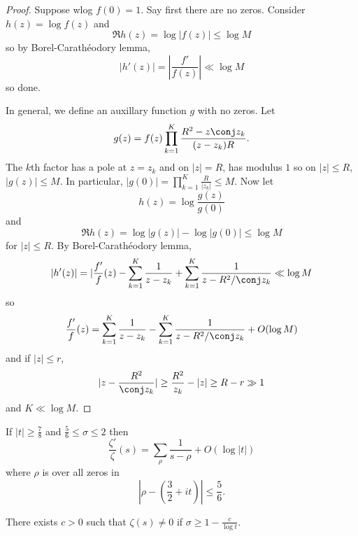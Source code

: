 \documentclass[a4paper]{article}
\theoremstyle{definition}
\begin{document}
\begin{proof}
  Suppose wlog \(f(0) = 1\). Say first there are no zeros. Consider \(h(z) = \log f(z)\) and
  \[
    \Re h(z) = \log |f(z)| \leq \log M
  \]
  so by Borel-Carathéodory lemma,
  \[
    |h'(z)| = |\frac{f'}{f(z)}| \ll \log M
  \]
  so done.

  In general, we define an auxillary function \(g\) with no zeros. Let
  \[
    g(z) = f(z) \prod_{k = 1}^K \frac{R^2 - z \conj z_k}{(z - z_k) R}.
  \]
  The \(k\)th factor has a pole at \(z = z_k\) and on \(|z| = R\), has modulus \(1\) so on \(|z| \leq R\), \(|g(z)| \leq M\). In particular, \(|g(0)| = \prod_{k = 1}^K \frac{R}{|z_k|} \leq M\). Now let
  \[
    h(z) = \log \frac{g(z)}{g(0)}
  \]
  and
  \[
    \Re h(z) = \log |g(z)| - \log |g(0)| \leq \log M
  \]
  for \(|z| \leq R\). By Borel-Carathéodory lemma,
  \[
    |h'(z)| = |\frac{f'}{f} (z) - \sum_{k = 1}^K \frac{1}{z - z_k} + \sum_{k = 1}^K \frac{1}{z - R^2/\conj z_k} \ll \log M
  \]
  so
  \[
    \frac{f'}{f} (z) = \sum_{k = 1}^K \frac{1}{z - z_k} - \sum_{k = 1}^K \frac{1}{z - R^2/\conj z_k} + O(\log M)
  \]
  and if \(|z| \leq r\),
  \[
    |z - \frac{R^2}{\conj z_k}| \geq \frac{R^2}{z_k} - |z| \geq R - r \gg 1
  \]
  and \(K \ll \log M\).
\end{proof}

\begin{corollary}
  If \(|t| \geq \frac{7}{8}\) and \(\frac{5}{6} \leq \sigma \leq 2\) then
  \[
    \frac{\zeta'}{\zeta}(s) = \sum_\rho \frac{1}{s - \rho} + O(\log |t|)
  \]
  where \(\rho\) is over all zeros in
  \[
    |\rho - (\frac{3}{2} + it)| \leq \frac{5}{6}.
  \]
\end{corollary}

\begin{theorem}
  There exists \(c > 0\) such that \(\zeta(s) \neq 0\) if \(\sigma \geq 1 - \frac{c}{\log t}\).
\end{theorem}
\end{document}
